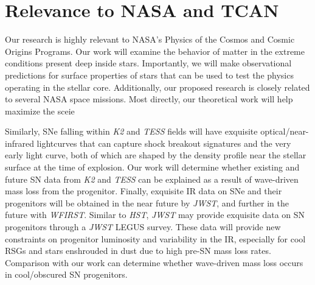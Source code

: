 {\color{orange}

\section{Relevance to NASA and TCAN}



Our research is highly relevant to NASA's Physics of the Cosmos and Cosmic Origins Programs. Our work will examine the behavior of matter in the extreme conditions present deep inside stars. Importantly, we will make observational predictions for surface properties of stars that can be used to test the physics operating in the stellar core. Additionally, our proposed research is closely related to several NASA space missions. Most directly, our theoretical work will help maximize the sceie

Similarly, SNe falling within {\it K2} and {\it TESS} fields will have exquisite optical/near-infrared lightcurves that can capture shock breakout signatures and the very early light curve, both of which are shaped by the density profile near the stellar surface at the time of explosion. Our work will determine whether existing and future SN data from {\it K2} and {\it TESS} can be explained as a result of wave-driven mass loss from the progenitor. Finally, exquisite IR data on SNe and their progenitors will be obtained in the near future by {\it JWST}, and further in the future with {\it WFIRST}. Similar to {\it HST}, {\it JWST} may provide exquisite data on SN progenitors through a {\it JWST} LEGUS survey. These data will provide new constraints on progenitor luminosity and variability in the IR, especially for cool RSGs and stars enshrouded in dust due to high pre-SN mass loss rates. Comparison with our work can determine whether wave-driven mass loss occurs in cool/obscured SN progenitors.


}